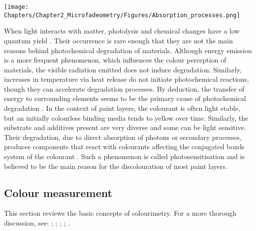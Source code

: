 \begin{figure*}[!h]
\centering
\texttt{[image: Chapters/Chapter2\_Microfadeometry/Figures/Absorption\_processes.png]}
\caption[\hspace{0.3cm}Photochemical processes - Absorption phenomena]{Photochemical processes induced by the absorption of optical radiation\footnote{The figure is based on that in the article by \citet[178, Figure 1]{van_beek_light-induced_1983}. The bond dissociation energy values are from \citet[373, Table 8.4]{zumdahl_chemistry_2000}}.}
\label{fig:photochemical_processes}
\end{figure*}



When light interacts with matter, photolysis and chemical changes have a low quantum yield \citep[47–8]{feller_accelerated_1994}. Their occurrence is rare enough that they are not the main reasons behind photochemical degradation of materials. Although energy emission is a more frequent phenomenon, which influences the colour perception of materials, the visible radiation emitted does not induce degradation. Similarly, increases in temperature via heat release do not initiate photochemical reactions, though they can accelerate degradation processes. By deduction, the transfer of energy to surrounding elements seems to be the primary cause of photochemical degradation \citep[51]{feller_accelerated_1994}. In the context of paint layers, the colourant is often light stable, but an initially colourless binding media tends to yellow over time. Similarly, the substrate and additives present are very diverse and some can be light sensitive. Their degradation, due to direct absorption of photons or secondary processes, produces components that react with colourants affecting the conjugated bonds system of the colourant \citep[180]{van_beek_light-induced_1983}. Such a phenomenon is called photosensitisation and is believed to be the main reason for the discolouration of most paint layers.

\subsection{Colour measurement}
\label{sec:colour_measurement}

This section reviews the basic concepts of colourimetry. For a more thorough discussion, see: \cite{berns_billmeyer_2019}; \citet{johnston-feller_color_2001}; \citet{minolta_precise_2007}; \citet{schanda_colorimetry_2007}; \citet{wyszecki_color_1982}.\\


